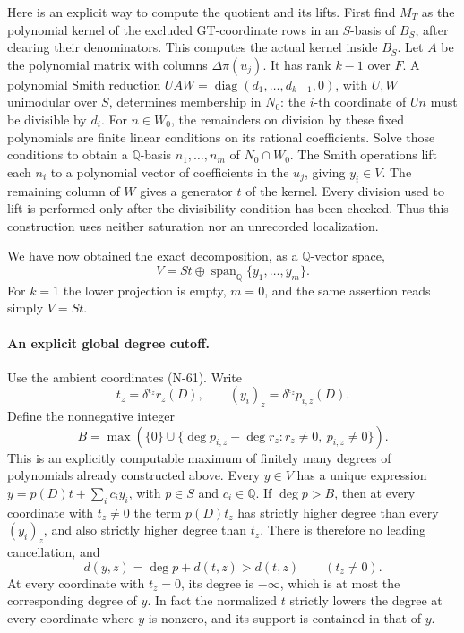 Here is an explicit way to compute the quotient and its lifts.
First find $M_T$ as the polynomial kernel of the excluded
GT-coordinate rows in an $S$-basis of $B_S$, after clearing
their denominators.  This computes the actual kernel inside
$B_S$.  Let $A$ be the polynomial matrix with columns
$\Delta\pi(u_j)$.  It has rank $k-1$ over $F$.
A polynomial Smith reduction
$U A W=\operatorname{diag}(d_1,\ldots,d_{k-1},0)$, with
$U,W$ unimodular over $S$, determines membership in $N_0$:
the $i$-th coordinate of $Un$ must be divisible by $d_i$.
For $n\in W_0$, the remainders on division by these fixed
polynomials are finite linear conditions on its rational
coefficients.  Solve those conditions to obtain a
$\mathbb Q$-basis $n_1,\ldots,n_m$ of $N_0\cap W_0$.
The Smith operations lift each $n_i$ to a polynomial vector
of coefficients in the $u_j$, giving $y_i\in V$.
The remaining column of $W$ gives a generator $t$ of the
kernel.  Every division used to lift is performed only
after the divisibility condition has been checked.
Thus this construction uses neither saturation nor an
unrecorded localization.

We have now obtained the exact decomposition, as a
$\mathbb Q$-vector space,
\[
                    V=S t\oplus
                          \operatorname{span}_{\mathbb Q}\{y_1,\ldots,y_m\}.
 \tag{N-72}
\]
For $k=1$ the lower projection is empty, $m=0$, and the
same assertion reads simply $V=S t$.

\paragraph{An explicit global degree cutoff.}
Use the ambient coordinates (N-61).  Write
\[
 t_z=\delta^{\epsilon_z}r_z(D),\qquad
 (y_i)_z=\delta^{\epsilon_z}p_{i,z}(D).
\]
Define the nonnegative integer
\[
 B=\max\left(\{0\}\cup
       \{\deg p_{i,z}-\deg r_z:
                   r_z\ne0,\ p_{i,z}\ne0\}\right).
 \tag{N-73}
\]
This is an explicitly computable maximum of finitely many
degrees of polynomials already constructed above.  Every
$y\in V$ has a unique expression
$y=p(D)t+\sum_i c_i y_i$, with $p\in S$ and $c_i\in\mathbb Q$.
If $\deg p>B$, then at every coordinate with $t_z\ne0$
the term $p(D)t_z$ has strictly higher degree than every
$(y_i)_z$, and also strictly higher degree than $t_z$.
There is therefore no leading cancellation, and
\[
             d(y,z)=\deg p+d(t,z)>d(t,z)
                       \qquad(t_z\ne0).
\]
At every coordinate with $t_z=0$, its degree is $-\infty$,
which is at most the corresponding degree of $y$.
In fact the normalized $t$ strictly lowers the degree at
every coordinate where $y$ is nonzero, and its support is
contained in that of $y$.

